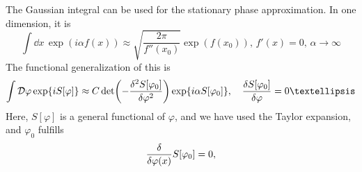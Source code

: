 The Gaussian integral can be used for the stationary phase approximation.
In one dimension, it is
\begin{equation}
    \int \dd x \, \exp(i \alpha f(x)) 
    \approx \sqrt{\frac{2 \pi }{f''(x_0)}}\exp( f(x_0)), 
    \, f'(x) = 0, \, \alpha\rightarrow \infty
\end{equation}
The functional generalization of this is
\begin{equation}
    \int \D \varphi \exp{i S[\varphi]}
    \approx 
    C \det(- \frac{\delta^2 S[\varphi_0]}{\delta \varphi^2})
    \exp{i \alpha S[\varphi_0]  }, \quad
    \frac{\delta S[\varphi_0]}{\delta \varphi} = 0…
\end{equation}
Here, $S[\varphi]$ is a general functional of $\varphi$, and we have used the Taylor expansion, and $\varphi_0$ fulfills
\begin{equation}
    \frac{\delta }{\delta \varphi(x)}{S[\varphi_0]} = 0,
\end{equation}

